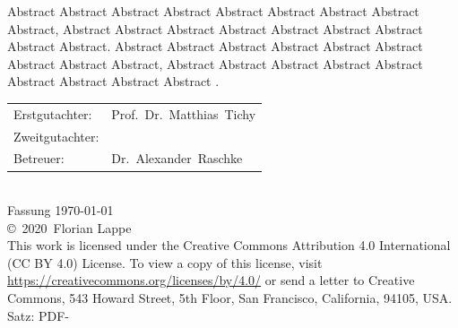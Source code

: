 \documentclass[a4paper,10pt
headsepline,           %
doubleside,            %
pointlessnumbers,      %
bibliography=totoc,              %
BCOR15mm,               %
leqno					%
]{scrbook}
\newcommand{\fullname}{Florian Lappe}
\newcommand{\jahr}{2020}
\newcommand{\gutachterA}{Prof.\ Dr.\ Matthias\ Tichy}
\newcommand{\gutachterB}{}
\newcommand{\betreuer}{Dr.\ Alexander\ Raschke}
\begin{document}
Abstract Abstract Abstract Abstract Abstract Abstract Abstract Abstract Abstract,
Abstract Abstract Abstract Abstract Abstract Abstract Abstract Abstract Abstract.
Abstract Abstract Abstract Abstract Abstract Abstract Abstract Abstract Abstract,
Abstract Abstract Abstract Abstract Abstract Abstract Abstract Abstract Abstract \cite{baar_correctly_2008}.
{
	\null
	\small
	\vfill
	\begin{center}
		\begin{tabular}{l l}
			Erstgutachter:  & \gutachterA \\
			Zweitgutachter: & \gutachterB \\
			Betreuer:       & \betreuer \\
		\end{tabular}\\[1cm]
		Fassung \today\\
		  \copyright~\jahr~\fullname\\[0.5em]
		This work is licensed under the Creative Commons Attribution 4.0 International (CC BY 4.0) License. To view a copy of this license, visit \href{https://creativecommons.org/licenses/by/4.0/}{https://creativecommons.org/licenses/by/4.0/} or send a letter to Creative Commons, 543 Howard Street, 5th Floor, San Francisco, California, 94105, USA. \\
		
		Satz: PDF-\LaTeXe
	\end{center}
}


\tableofcontents

\mainmatter %














\end{document}
